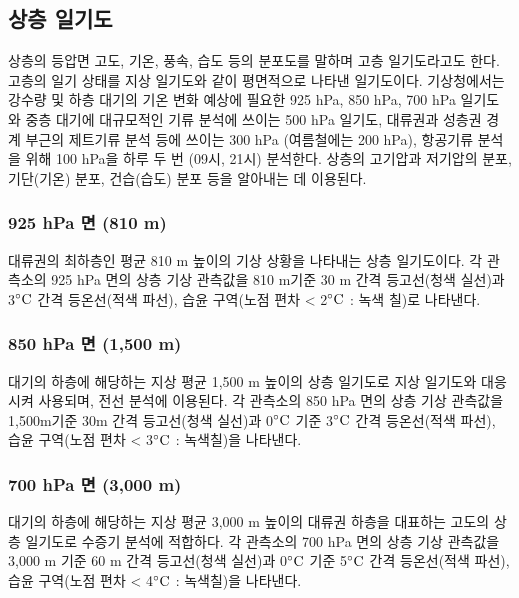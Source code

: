 \newpage
\subsection{상층 일기도}

상층의 등압면 고도, 기온, 풍속, 습도 등의 분포도를 말하며 고층 일기도라고도 한다. 고층의 일기 상태를 지상 일기도와 같이 평면적으로 나타낸 일기도이다. 기상청에서는 강수량 및 하층 대기의 기온 변화 예상에 필요한 925 hPa, 850 hPa, 700 hPa 일기도와 중층 대기에 대규모적인 기류 분석에 쓰이는 500 hPa 일기도, 대류권과 성층권 경계 부근의 제트기류 분석 등에 쓰이는 300 hPa (여름철에는 200 hPa), 항공기류 분석을 위해 100 hPa을 하루 두 번 (09시, 21시) 분석한다. 상층의 고기압과 저기압의 분포, 기단(기온) 분포, 건습(습도) 분포 등을 알아내는 데 이용된다.

\subsubsection{925 hPa 면 (810 m)}
대류권의 최하층인 평균 810 m 높이의 기상 상황을 나타내는 상층 일기도이다. 각 관측소의 925 hPa 면의 상층 기상 관측값을 810 m기준 30 m 간격 등고선(청색 실선)과 3$\rm ^{\circ}C$ 간격 등온선(적색 파선), 습윤 구역(노점 편차 < 2$\rm ^{\circ}C$ : 녹색 칠)로 나타낸다. 

\subsubsection{850 hPa 면 (1,500 m)}
대기의 하층에 해당하는 지상 평균 1,500 m 높이의 상층 일기도로 지상 일기도와 대응시켜 사용되며, 전선 분석에 이용된다. 각 관측소의 850 hPa 면의 상층 기상 관측값을 1,500m기준 30m 간격 등고선(청색 실선)과 0$\rm ^{\circ}C$ 기준 3$\rm ^{\circ}C$ 간격 등온선(적색 파선), 습윤 구역(노점 편차 < 3$\rm ^{\circ}C$ : 녹색칠)을 나타낸다.

\subsubsection{700 hPa 면 (3,000 m)}
대기의 하층에 해당하는 지상 평균 3,000 m 높이의 대류권 하층을 대표하는 고도의 상층 일기도로 수증기 분석에 적합하다. 각 관측소의 700 hPa 면의 상층 기상 관측값을 3,000 m 기준 60 m 간격 등고선(청색 실선)과 0$\rm ^{\circ}C$  기준 5$\rm ^{\circ}C$  간격 등온선(적색 파선), 습윤 구역(노점 편차 < 4$\rm ^{\circ}C$ : 녹색칠)을 나타낸다. 

